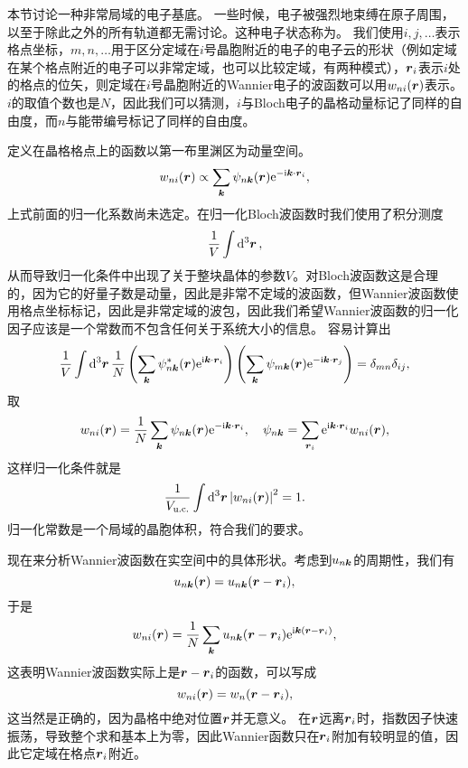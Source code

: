 本节讨论一种非常局域的电子基底。
一些时候，电子被强烈地束缚在原子周围，以至于除此之外的所有轨道都无需讨论。这种电子状态称为。
我们使用$i, j, \ldots$表示格点坐标，$m, n, \ldots$用于区分定域在$i$号晶胞附近的电子的电子云的形状（例如定域在某个格点附近的电子可以非常定域，也可以比较定域，有两种模式），$\vb*{r}_i$表示$i$处的格点的位矢，则定域在$i$号晶胞附近的Wannier电子的波函数可以用$w_{ni}(\vb*{r})$表示。
$i$的取值个数也是$N$，因此我们可以猜测，$i$与Bloch电子的晶格动量标记了同样的自由度，而$n$与能带编号标记了同样的自由度。

定义在晶格格点上的函数以第一布里渊区为动量空间。
\[
    w_{ni}(\vb*{r}) \propto \sum_{\vb*{k}} \psi_{n\vb*{k}}(\vb*{r}) \mathrm{e}^{- \mathrm{i} \vb*{k} \cdot \vb*{r}_i},
\]
上式前面的归一化系数尚未选定。在归一化Bloch波函数时我们使用了积分测度
\[
    \frac{1}{V} \int \dd[3]{\vb*{r}},
\]
从而导致归一化条件中出现了关于整块晶体的参数$V$。对Bloch波函数这是合理的，因为它的好量子数是动量，因此是非常不定域的波函数，但Wannier波函数使用格点坐标标记，因此是非常定域的波包，因此我们希望Wannier波函数的归一化因子应该是一个常数而不包含任何关于系统大小的信息。
容易计算出
\[
    \frac{1}{V} \int \dd[3]{\vb*{r}} \frac{1}{N} \left( \sum_{\vb*{k}} \psi^*_{n\vb*{k}}(\vb*{r}) \mathrm{e}^{\mathrm{i} \vb*{k} \cdot \vb*{r}_i} \right) \left( \sum_{\vb*{k}} \psi_{m\vb*{k}}(\vb*{r}) \mathrm{e}^{- \mathrm{i} \vb*{k} \cdot \vb*{r}_j} \right) = \delta_{mn} \delta_{ij},
\]
取
\begin{equation}
    w_{ni}(\vb*{r}) = \frac{1}{N} \sum_{\vb*{k}} \psi_{n\vb*{k}}(\vb*{r}) \mathrm{e}^{-\mathrm{i} \vb*{k} \cdot \vb*{r}_i}, \quad \psi_{n\vb*{k}} = \sum_{\vb*{r}_i} \mathrm{e}^{\mathrm{i} \vb*{k} \cdot \vb*{r}_i} w_{ni}(\vb*{r}),
\end{equation}
这样归一化条件就是
\begin{equation}
    \frac{1}{V_\text{u.c.}} \int \dd[3]{\vb*{r}} \abs{w_{ni}(\vb*{r})}^2 = 1.
\end{equation}
归一化常数是一个局域的晶胞体积，符合我们的要求。

现在来分析Wannier波函数在实空间中的具体形状。考虑到$u_{n\vb*{k}}$的周期性，我们有
\[
    u_{n\vb*{k}} (\vb*{r}) = u_{n\vb*{k}} (\vb*{r} - \vb*{r}_i),
\]
于是
\begin{equation}
    w_{ni}(\vb*{r}) = \frac{1}{N} \sum_{\vb*{k}} u_{n\vb*{k}} (\vb*{r} - \vb*{r}_i) \mathrm{e}^{\mathrm{i} \vb*{k} (\vb*{r} - \vb*{r}_i)},
\end{equation}
这表明Wannier波函数实际上是$\vb*{r} - \vb*{r}_i$的函数，可以写成
\begin{equation}
    w_{ni}(\vb*{r}) = w_{n}(\vb*{r} - \vb*{r}_i),
\end{equation}
这当然是正确的，因为晶格中绝对位置$\vb*{r}$并无意义。
在$\vb*{r}$远离$\vb*{r}_i$时，指数因子快速振荡，导致整个求和基本上为零，因此Wannier函数只在$\vb*{r}_i$附加有较明显的值，因此它定域在格点$\vb*{r}_i$附近。

